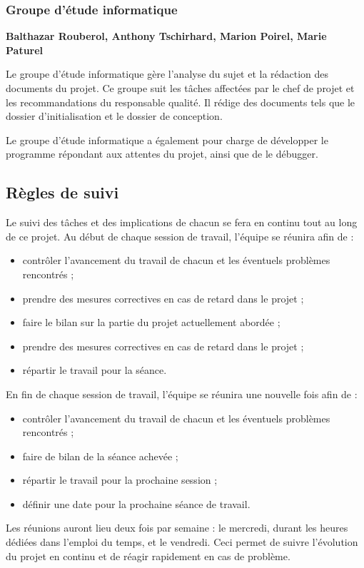\subsubsection{Groupe d'étude informatique}
\textbf{Balthazar Rouberol, Anthony Tschirhard, Marion Poirel, Marie Paturel}

Le groupe d'étude informatique gère l'analyse du sujet et la rédaction des documents du projet. Ce groupe suit les tâches affectées par le chef de projet et les recommandations du responsable qualité. Il rédige des documents tels que le dossier d'initialisation et le dossier de conception.

Le groupe d'étude informatique a également pour charge de développer le programme répondant aux attentes du projet, ainsi que de le débugger.


\subsection{Règles de suivi}
Le suivi des tâches et des implications de chacun se fera en continu tout au long de ce projet. Au début de chaque session de travail, l'équipe se réunira afin de :
\begin{itemize}
  \item contrôler l'avancement du travail de chacun et les éventuels problèmes rencontrés ;
  \item prendre des mesures correctives en cas de retard dans le projet ;
  \item faire le bilan sur la partie du projet actuellement abordée ;
  \item prendre des mesures correctives en cas de retard dans le projet ;
  \item répartir le travail pour la séance.
\end{itemize}

\medskip
En fin de chaque session de travail, l'équipe se réunira une nouvelle fois afin de :
\begin{itemize}
  \item contrôler l'avancement du travail de chacun et les éventuels problèmes rencontrés ;
  \item faire de bilan de la séance achevée ;
  \item répartir le travail pour la prochaine session ;
  \item définir une date pour la prochaine séance de travail.
\end{itemize}

Les réunions auront lieu deux fois par semaine : le mercredi, durant les heures dédiées dans l'emploi du temps, et le vendredi. Ceci permet de suivre l'évolution du projet en continu et de réagir rapidement en cas de problème.


